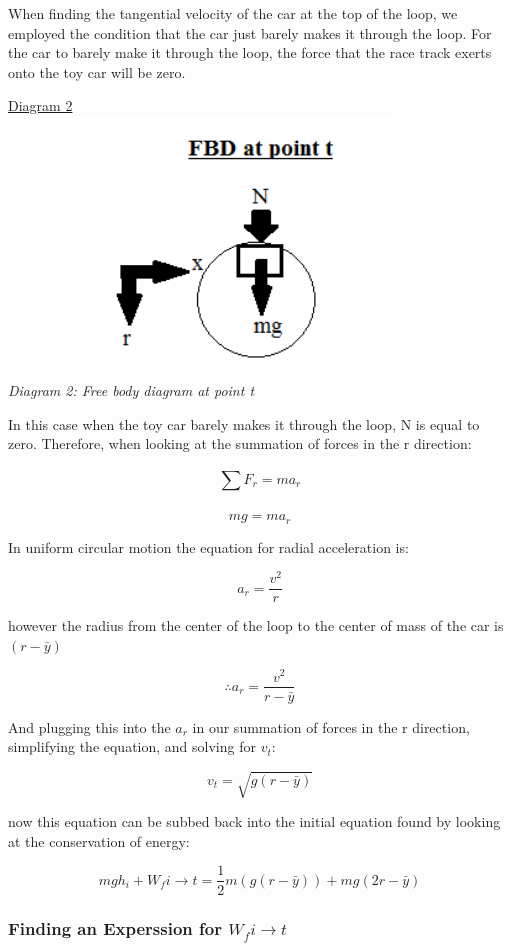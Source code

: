 \documentclass[aps,letterpaper,11pt]{revtex4}
\begin{document}
When finding the tangential velocity of the car at the top of the loop, we employed the condition that the car just barely makes it through the loop. For the car to barely make it through the loop, the force that the race track exerts onto the toy car will be zero. 

\begin{center}
\underline{Diagram 2}\\
\includegraphics[width=4in]{FBDATT.png}\\
\textit{Diagram 2: Free body diagram at point t}
\end{center}

In this case when the toy car barely makes it through the loop, N is equal to zero. Therefore, when looking at the summation of forces in the r direction: 

$$ \sum_{}^{}F_r = ma_r$$

$$ mg = ma_r$$

In uniform circular motion the equation for radial acceleration is:

$$ a_r=\frac{v^2}{r}$$

however the radius from the center of the loop to the center of mass of the car is $(r-\bar{y})$

$$\therefore a_r = \frac{v^2}{r - \bar{y}}$$

And plugging this into the $a_r$ in our summation of forces in the r direction, simplifying the equation, and solving for $v_t$:

$$ v_t = \sqrt{g(r-\bar{y})}$$

now this equation can be subbed back into the initial equation found by looking at the conservation of energy:

$$ mgh_i + W_fi \rightarrow t = \frac{1}{2}m(g(r-\bar{y})) + mg(2r-\bar{y})$$

\subsubsection{Finding an Experssion for $W_fi \rightarrow t$}
\end{document}
